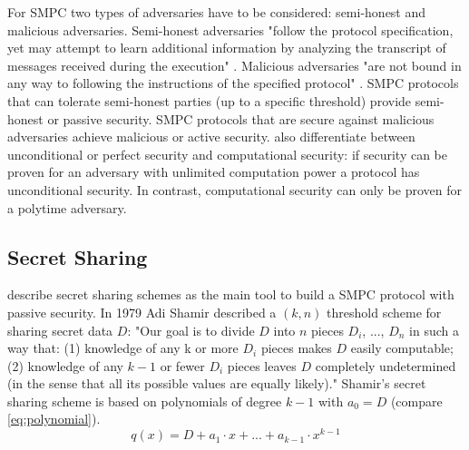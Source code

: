 		
		
		
		For \gls{SMPC} two types of adversaries have to be considered: semi-honest and malicious adversaries.
		Semi-honest adversaries "follow the protocol specification, yet may attempt to learn additional information by analyzing the transcript of messages received during the execution" \autocite{Aumann2007}. Malicious adversaries "are not bound in any way to following the instructions of the specified protocol" \autocite{Aumann2007}.
		\gls{SMPC} protocols that can tolerate semi-honest parties (up to a specific threshold) provide semi-honest or passive security. \gls{SMPC} protocols that are secure against malicious adversaries achieve malicious or active security.
		\textcite[p. 82]{Cramer2015} also differentiate between unconditional or perfect security and computational security: if security can be proven for an adversary with unlimited computation power a protocol has unconditional security. In contrast, computational security can only be proven for a polytime adversary.
		
		

		\subsection{Secret Sharing}
		\label{Secret Sharing}
		
		\textcite[p. 32]{Cramer2015} describe secret sharing schemes as the main tool to build a \gls{SMPC} protocol with passive security. In 1979 Adi Shamir described a $(k, n)$ threshold scheme for sharing secret data $D$: "Our goal is to divide $D$ into $n$ pieces $D_i$, ..., $D_n$ in such a way that:
		(1) knowledge of any k or more $D_i$ pieces makes $D$ easily computable; (2) knowledge of any $k-1$ or fewer $D_i$ pieces leaves $D$ completely undetermined (in the sense that all its possible values are equally likely)." \autocite{Shamir1979}
		Shamir's secret sharing scheme is based on polynomials of degree $k-1$ with $a_0=D$ (compare \ref{eq:polynomial}). 
		\begin{equation}
		\label{eq:polynomial}
		q(x)=D + a_1 \cdot x + ... + a_{k-1} \cdot x^{k-1}
		\end{equation}
		
